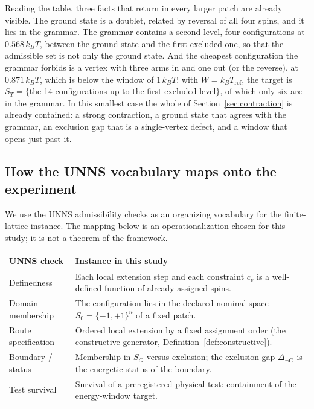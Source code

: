 \documentclass[11pt,a4paper]{article}
\theoremstyle{plain}
\theoremstyle{definition}
\theoremstyle{remark}
\newcommand{\SG}{S_{G}}
\newcommand{\Sz}{S_{0}}
\newcommand{\ST}{S_{T}}
\newcommand{\dnG}{\Delta_{\neg G}}
\newcommand{\kBT}{k_{B}T}
\begin{document}
Reading the table, three facts that return in every larger patch are already visible. The ground state is a doublet, related by reversal of all four spins, and it lies in the grammar. The grammar contains a second level, four configurations at $0.568\,\kBT$, between the ground state and the first excluded one, so that the admissible set is not only the ground state. And the cheapest configuration the grammar forbids is a vertex with three arms in and one out (or the reverse), at $0.871\,\kBT$, which is below the window of $1\,\kBT$: with $W=\kBT_{\mathrm{ref}}$, the target is $\ST=\{$the 14 configurations up to the first excluded level$\}$, of which only six are in the grammar. In this smallest case the whole of Section~\ref{sec:contraction} is already contained: a strong contraction, a ground state that agrees with the grammar, an exclusion gap that is a single-vertex defect, and a window that opens just past it.

\subsection{How the UNNS vocabulary maps onto the experiment}
We use the UNNS admissibility checks as an organizing vocabulary for the finite-lattice instance. The mapping below is an operationalization chosen for this study; it is not a theorem of the framework.

\begin{center}\small
\begin{tabularx}{\linewidth}{@{}p{3.3cm}X@{}}
\toprule
UNNS check & Instance in this study\\
\midrule
Definedness & Each local extension step and each constraint $c_v$ is a well-defined function of already-assigned spins.\\
Domain membership & The configuration lies in the declared nominal space $\Sz=\{-1,+1\}^n$ of a fixed patch.\\
Route specification & Ordered local extension by a fixed assignment order (the constructive generator, Definition~\ref{def:constructive}).\\
Boundary / status & Membership in $\SG$ versus exclusion; the exclusion gap $\dnG$ is the energetic status of the boundary.\\
Test survival & Survival of a preregistered physical test: containment of the energy-window target.\\
\bottomrule
\end{tabularx}
\end{center}
\end{document}
